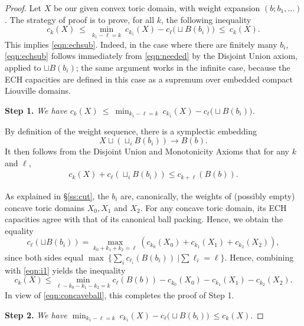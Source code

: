 \documentclass[11pt, reqno]{amsart}
\theoremstyle{remark}
\numberwithin{equation}{subsection}
\numberwithin{figure}{section}
\theoremstyle{customremark}
\newcommand{\NI}{{\noindent}}
\newcommand{\MS}{{\medskip}}
\begin{document}
\begin{proof}
Let $X$ be our given convex toric domain, with weight expansion $(b; b_1, \ldots)$.   The strategy of proof is to prove, for all $k$, the following inequality
\begin{equation}
\label{eqn:needed}
c_k(X)\ \le \ \min_{k_1 - \ell = k}\ c_{k_1}(X) - c_\ell\bigl(\sqcup B(b_i)\bigr)\ \le \ c_k(X).
\end{equation}
This implies \eqref{eqn:echsub}.  Indeed, in the case where there are finitely many $b_i$, \eqref{eqn:echsub} follows immediately from \eqref{eqn:needed} by the Disjoint Union axiom, applied to $\sqcup B(b_i)$; the same argument works in the infinite case, because the ECH capacities are defined in this case as a supremum over embedded compact Liouville domains.
\MS



\NI {\bf
 Step 1.}  {\it We have $c_k(X)\ \le \ \min_{k_1 - \ell = k}\ c_{k_1}(X) - c_\ell\bigl(\sqcup B(b_i)\bigr)$.}

 By definition of the weight sequence, there is a symplectic embedding
\[ X \sqcup ( \sqcup_i B(b_i)) \to B(b).\]
It then follows from the Disjoint Union and Monotonicity Axioms that for any $k$ and $\ell$,
\begin{align}\label{eqn:i1} 
c_{k}(X) + c_\ell(\sqcup_i B(b_i) ) \le c_{k + \ell}(B(b)).
\end{align}
 
 As explained in \S\ref{ss:cut}, the $b_i$ are, canonically, the weights of (possibly empty) concave toric domains $X_0, X_1$ and $X_2$.  For any concave toric domain, its ECH capacities agree with that of its canonical ball packing.  Hence, we obtain the equality
\begin{equation}
\label{eqn:concaveball}
c_{\ell}( \sqcup B(b_i)) = \max_{k_0 + k_1 + k_2 = \ell}( c_{k_0}(X_0) + c_{k_1}(X_1) + c_{k_2}(X_2)),
\end{equation}
since both sides equal $\max\ \bigl\{ \sum_i c_{\ell_i}(B(b_i)) \ \bigl| \sum \ell_i = \ell\bigr\}.$ Hence, combining with \eqref{eqn:i1} yields the inequality
\begin{equation*}
\label{eqn:i2}
c_{k}(X) \le\min_{\ell - k_0 - k_1 - k_2 = k} c_{\ell}(B(b)) - c_{k_0}(X_0) - c_{k_1}(X_1) - c_{k_2}(X_2).
\end{equation*}
 In view of \eqref{eqn:concaveball}, this completes the proof of Step 1. 
\MS

\NI {\bf Step 2.}   {\it We have $ \min_{k_1 - \ell = k}\ c_{k_1}(X) - c_\ell\bigl(\sqcup B(b_i)\bigr)\ \le c_k(X).$}


\end{proof}
\end{document}

